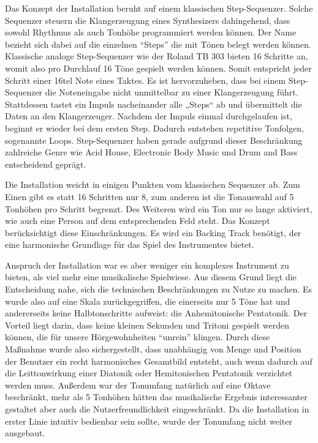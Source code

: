 \label{sec:music}

Das Konzept der Installation beruht auf einem klassischen Step-Sequenzer. Solche Sequenzer steuern die Klangerzeugung eines Synthesizers dahingehend, dass sowohl Rhythmus als auch Tonhöhe programmiert werden können. Der Name bezieht sich dabei auf die einzelnen \enquote{Steps} die mit Tönen belegt werden können. Klassische analoge Step-Sequenzer wie der Roland TB 303 bieten 16 Schritte an, womit also pro Durchlauf 16 Töne gespielt werden können. Somit entspricht jeder Schritt einer 16tel Note eines Taktes. Es ist hervorzuheben, dass bei einem Step-Sequenzer die Noteneingabe nicht unmittelbar zu einer Klangerzeugung führt. Stattdessen tastet ein Impuls nacheinander alle „Steps“ ab und übermittelt die Daten an den Klangerzeuger. Nachdem der Impuls einmal durchgelaufen ist, beginnt er wieder bei dem ersten Step. Dadurch entstehen repetitive Tonfolgen, sogenannte Loops. Step-Sequenzer haben gerade aufgrund dieser Beschränkung zahlreiche Genre wie Acid House, Electronic Body Music und Drum and Bass entscheidend geprägt.

Die Installation weicht in einigen Punkten vom klassischen Sequenzer ab. Zum Einen gibt es statt 16 Schritten nur 8, zum anderen ist die Tonauswahl auf 5 Tonhöhen pro Schritt begrenzt. Des Weiteren wird ein Ton nur so lange aktiviert, wie auch eine Person auf dem entsprechenden Feld steht. Das Konzept berücksichtigt diese Einschränkungen. Es wird ein Backing Track benötigt, der eine harmonische Grundlage für das Spiel des Instrumentes bietet.

Anspruch der Installation war es aber weniger ein komplexes Instrument zu bieten, als viel mehr eine musikalische Spielwiese. Aus diesem Grund liegt die Entscheidung nahe, sich die technischen Beschränkungen zu Nutze zu machen. Es wurde also auf eine Skala zurückgegriffen, die einerseits nur 5 Töne hat und andererseits keine Halbtonschritte aufweist: die Anhemitonische Pentatonik. Der Vorteil liegt darin, dass keine kleinen Sekunden und Tritoni gespielt werden können, die für unsere Hörgewohnheiten \enquote{unrein} klingen. Durch diese Maßnahme wurde also sichergestellt, dass unabhängig von Menge und Position der Benutzer ein recht harmonisches Gesamtbild entsteht, auch wenn dadurch auf die Leittonwirkung einer Diatonik oder Hemitonischen Pentatonik verzichtet werden muss. Außerdem war der Tonumfang natürlich auf eine Oktave beschränkt, mehr als 5 Tonhöhen hätten das musikalische Ergebnis interessanter gestaltet aber auch die Nutzerfreundlichkeit eingeschränkt. Da die Installation in erster Linie intuitiv bedienbar sein sollte, wurde der Tonumfang nicht weiter ausgebaut.

